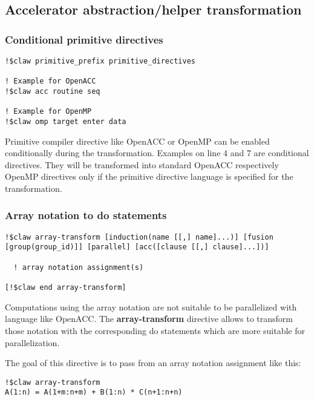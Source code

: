 \subsection{Accelerator abstraction/helper transformation}

\subsubsection{Conditional primitive directives}
\begin{lstlisting}
!$claw primitive_prefix primitive_directives

! Example for OpenACC
!$claw acc routine seq

! Example for OpenMP
!$claw omp target enter data
\end{lstlisting}

Primitive compiler directive like OpenACC or OpenMP can be enabled conditionally
during the transformation. Examples on line 4 and 7 are conditional directives.
They will be transformed into standard OpenACC respectively OpenMP directives
only if the primitive directive language is specified for the transformation.

\subsubsection{Array notation to do statements}
\begin{lstlisting}
!$claw array-transform [induction(name [[,] name]...)] [fusion [group(group_id)]] [parallel] [acc([clause [[,] clause]...])]

  ! array notation assignment(s)

[!$claw end array-transform]
\end{lstlisting}

Computations using the array notation are not suitable to be parallelized with
language like OpenACC. The \textbf{array-transform} directive allows to
transform those notation with the corresponding do statements which are more
suitable for parallelization.

The goal of this directive is to pass from an array notation assignment like
this:

\begin{lstlisting}
!$claw array-transform
A(1:n) = A(1+m:n+m) + B(1:n) * C(n+1:n+n)
\end{lstlisting}


